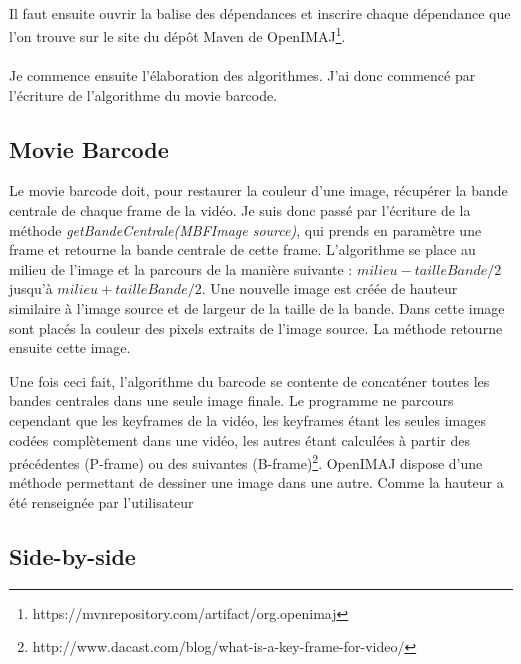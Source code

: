 \documentclass[10pt,a4paper]{article}
\begin{document}


~~\\
Il faut ensuite ouvrir la balise des dépendances et inscrire chaque dépendance que l'on trouve sur le site du dépôt Maven de OpenIMAJ\footnote{https://mvnrepository.com/artifact/org.openimaj}.\\


~~\\


Je commence ensuite l'élaboration des algorithmes. J'ai donc commencé par l'écriture de l'algorithme du movie barcode.
\subsection{Movie Barcode}

Le movie barcode doit, pour restaurer la couleur d'une image, récupérer la bande centrale de chaque frame de la vidéo. Je suis donc passé par l'écriture de la méthode \textit{getBandeCentrale(MBFImage source)},
qui prends en paramètre une frame et retourne la bande centrale de cette frame. L'algorithme se place au milieu de l'image et la parcours de la manière suivante : $milieu - tailleBande /2$ jusqu'à $milieu + tailleBande /2$. Une nouvelle image est créée de hauteur similaire à l'image source et de largeur de la taille de  la bande. Dans cette image sont placés la couleur des pixels extraits de l'image source. La méthode retourne ensuite cette image.

Une fois ceci fait, l'algorithme du barcode se contente de concaténer toutes les bandes centrales dans une seule image finale. Le programme ne parcours cependant que les keyframes de la vidéo, les keyframes étant les seules images codées complètement dans une vidéo, les autres étant calculées à partir des précédentes
(P-frame) ou des suivantes (B-frame)\footnote{http://www.dacast.com/blog/what-is-a-key-frame-for-video/}. OpenIMAJ dispose d'une méthode permettant de dessiner une image dans une autre. Comme la hauteur a été renseignée par l'utilisateur 


\subsection{Side-by-side}
\end{document}
